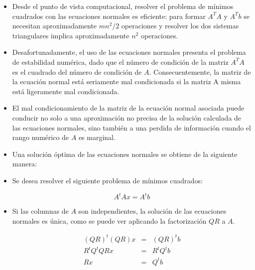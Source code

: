 \documentclass{beamer}
\begin{document}
\begin{frame}{}
\begin{itemize}
 \item Desde el punto de vista computacional, resolver el problema de m\'inimos cuadrados con las ecuaciones normales 
es eficiente: para formar $A^TA$ y $A^Tb$ se necesitan aproximadamente $mn^2/2$ operaciones y resolver los dos sistemas 
triangulares implica aproximadamente $n^2$ operaciones.
\item<2-> Desafortunadamente, el uso de las ecuaciones normales presenta el problema de estabilidad num\'erica, dado 
que el n\'umero de condici\'on de la matriz $A^TA$ es el cuadrado del n\'umero de condici\'on de $A$. Consecuentemente, 
la matriz de la ecuaci\'on normal est\'a seriamente mal condicionada si la matriz A misma est\'a ligeramente mal 
condicionada.
\item<3-> El mal condicionamiento de la matriz de la ecuaci\'on normal asociada puede conducir no solo a una 
aproximaci\'on no precisa de la soluci\'on calculada de las  ecuaciones normales, sino tambi\'en a una perdida de 
informaci\'on cuando el rango num\'erico de $A$ es marginal.
\end{itemize}
\end{frame}
\begin{frame}{}
  \begin{itemize}
   \item<1-> Una soluci\'on \'optima de las ecuaciones normales se obtiene de la siguiente manera:
   \item<2-> Se desea resolver el siguiente problema de m\'inimos cuadrados:
   \begin{block}{}        
   $$A^tAx = A^tb$$
  \end{block}
   \item<3-> Si las columnas de $A$ son independientes, la soluci\'on de las ecuaciones normales es \'unica, como se puede ver aplicando la factorizaci\'on $QR$ a $A$.
   \begin{block}{}
   \begin{eqnarray}
    \nonumber (QR)^t(QR)x &=& (QR)^tb\\
    \nonumber R^tQ^tQRx &=& R^tQ^tb\\
    \nonumber Rx &=& Q^tb
  \end{eqnarray}
   \end{block}
  \end{itemize}
\end{frame}
\end{document}
